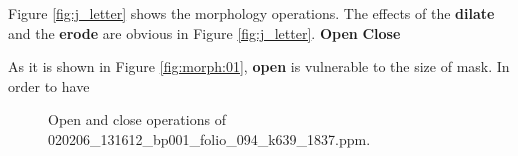 \documentclass[paper=a4, fontsize=11pt]{scrartcl}
\numberwithin{equation}{section}		%
\numberwithin{figure}{section}			%
\numberwithin{table}{section}				%
\begin{document}
Figure \ref{fig:j_letter} shows the morphology operations.
The effects of the \textbf{dilate} and the \textbf{erode} are obvious in Figure \ref{fig:j_letter}.
\textbf{Open}
\textbf{Close} 

As it is shown in Figure \ref{fig:morph:01}, \textbf{open} is vulnerable to the size of mask.
In order to have 

\begin{figure}[h]
\centering
{}
\caption{Open and close operations of 020206\_131612\_bp001\_folio\_094\_k639\_1837.ppm.}\label{fig:morph:02}
\end{figure}
\end{document}
